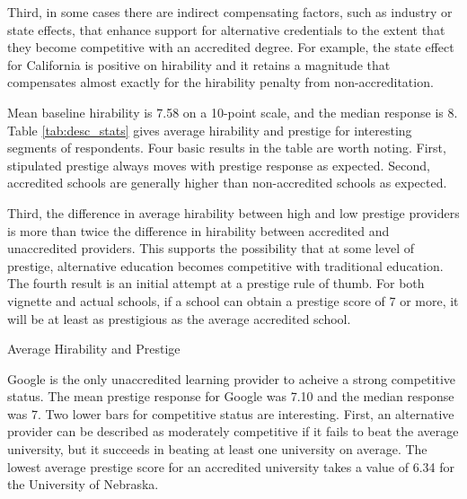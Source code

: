 \documentclass[review]{elsarticle}
\begin{document}
Third, in some cases there are indirect compensating factors, such as industry or state effects,
that enhance support for alternative credentials to the extent that they become competitive with an accredited degree.
For example, the state effect for California is positive on hirability
and it retains a magnitude that compensates almost exactly for the hirability penalty from non-accreditation.

Mean baseline hirability is 7.58 on a 10-point scale, and the median response is 8.
Table \ref{tab:desc_stats} gives average hirability and prestige for interesting segments of respondents.
Four basic results in the table are worth noting.
First, stipulated prestige always moves with prestige response as expected.
Second, accredited schools are generally higher than non-accredited schools as expected.

Third, the difference in average hirability between high and low prestige providers
is more than twice the difference in hirability between accredited and unaccredited providers.
This supports the possibility that at some level of prestige,
alternative education becomes competitive with traditional education.
The fourth result is an initial attempt at a prestige rule of thumb.
For both vignette and actual schools,
if a school can obtain a prestige score of 7 or more,
it will be at least as prestigious as the average accredited school.

\begin{table}
    \caption{Average Hirability and Prestige}
    \resizebox{\columnwidth}{!}{
        
    }
    \label{tab:desc_stats}
\end{table}


Google is the only unaccredited learning provider to acheive a strong competitive status.
The mean prestige response for Google was 7.10 and the median response was 7.
Two lower bars for competitive status are interesting.
First, an alternative provider can be described as moderately competitive if it fails to beat the average university,
but it succeeds in beating at least one university on average.
The lowest average prestige score for an accredited university takes a value of 6.34 for the University of Nebraska.
\end{document}
